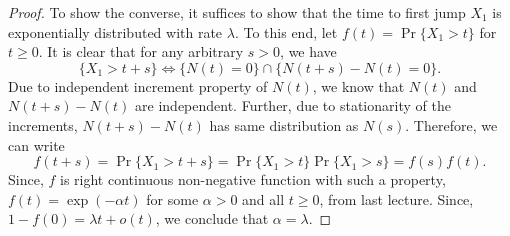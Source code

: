 \documentclass[a4paper,10pt]{article}
\theoremstyle{plain}
\theoremstyle{definition}
\begin{document}
\begin{proof}
To show the converse, it suffices to show that the time to first jump $X_{1}$ is exponentially distributed with rate $\lambda$. To this end, let $f(t) = \Pr\{X_{1}>t\}$ for $t \geq 0$. It is clear that for any arbitrary $s>0$, we have
\begin{equation*}
\{X_{1}>t+s\}\iff \{N(t)=0\}\cap\{N(t+s)-N(t)=0\}.
\end{equation*}
Due to independent increment property of $N(t)$, we know that $N(t)$ and $N(t+s)-N(t)$ are independent. Further, due to stationarity of the increments, $N(t+s) - N(t)$ has same distribution as $N(s)$. Therefore, we can write
\begin{equation*}
 f(t+s) =   \Pr\{X_{1}>t+s\} = \Pr\{X_{1}>t\} \Pr\{X_{1}>s\} = f(s)f(t).
\end{equation*}
Since, $f$ is right continuous non-negative function with such a property, $f(t) = \exp(-\alpha t)$ for some $\alpha > 0$ and all $t \geq 0$, from last lecture. Since, $1 - f(0) = \lambda t + o(t)$, we conclude that $\alpha = \lambda$.


\end{proof}
\end{document}
